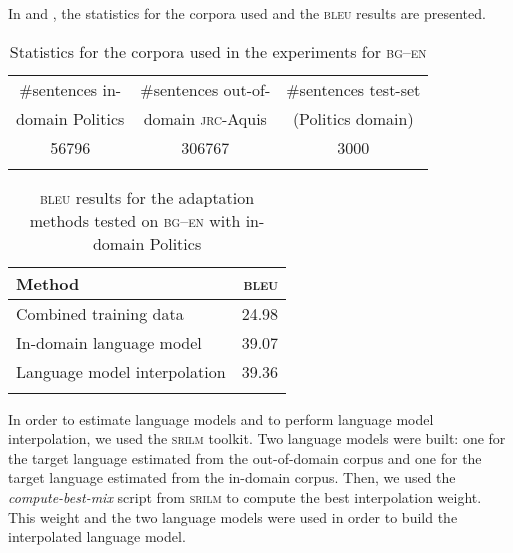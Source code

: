 \documentclass[output=paper]{LSP/langsci}
\begin{document}
In  and , the statistics for the corpora used and the \textsc{bleu} results are presented.
  
\begin{table}
\begin{tabular}{ccc}
\lsptoprule
 {\#sentences in-} & {\#sentences out-of-} & {\#sentences test-set}\\
 {domain Politics} & {domain \textsc{jrc}-Aquis} & {(Politics domain})\\
\midrule
 56796 & 306767 & 3000\\
\lspbottomrule
\end{tabular}
\caption{Statistics for the corpora used in the experiments for \textsc{bg--en}}
\label{tab:dumavertan:3}
\end{table}

\begin{table}
\begin{tabular}{lr}
\lsptoprule
 {Method} & {\textsc{bleu}}\\
 \midrule
 Combined training data & 24.98\\
 In-domain language model & 39.07\\
 Language model interpolation & 39.36\\
\lspbottomrule
\end{tabular}
\caption{\textsc{bleu} results for the adaptation methods tested on \textsc{bg--en} with in-domain Politics}
\label{tab:dumavertan:4}
\end{table}

\largerpage
In order to estimate language models and to perform language model interpolation, we used the \textsc{srilm} toolkit. Two language models were built: one for the target language estimated from the out-of-domain corpus and one for the target language estimated from the in-domain corpus. Then, we used the \textit{compute-best-mix} script from \textsc{srilm} to compute the best interpolation weight. This weight and the two language models were used in order to build the interpolated language model.
\end{document}
